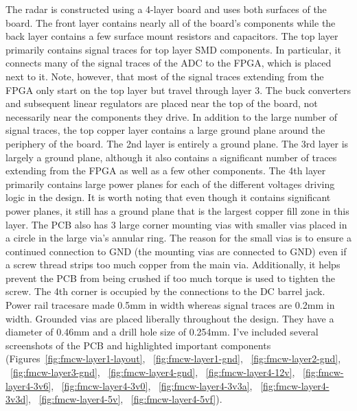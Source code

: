 \documentclass{default}
\begin{document}
The radar is constructed using a 4-layer board and uses both surfaces of the board. The front layer
contains nearly all of the board's components while the back layer contains a few surface mount
resistors and capacitors. The top layer primarily contains signal traces for top layer SMD
components. In particular, it connects many of the signal traces of the ADC to the FPGA, which is
placed next to it. Note, however, that most of the signal traces extending from the FPGA only start
on the top layer but travel through layer 3. The buck converters and subsequent linear regulators
are placed near the top of the board, not necessarily near the components they drive. In addition to
the large number of signal traces, the top copper layer contains a large ground plane around the
periphery of the board. The 2nd layer is entirely a ground plane. The 3rd layer is largely a ground
plane, although it also contains a significant number of traces extending from the FPGA as well as a
few other components. The 4th layer primarily contains large power planes for each of the different
voltages driving logic in the design. It is worth noting that even though it contains significant
power planes, it still has a ground plane that is the largest copper fill zone in this layer. The
PCB also has 3 large corner mounting vias with smaller vias placed in a circle in the large via's
annular ring. The reason for the small vias is to ensure a continued connection to GND (the mounting
vias are connected to GND) even if a screw thread strips too much copper from the main
via. Additionally, it helps prevent the PCB from being crushed if too much torque is used to tighten
the screw. The 4th corner is occupied by the connections to the DC barrel jack. Power rail tracesare
made 0.5mm in width whereas signal traces are 0.2mm in width. Grounded vias are placed liberally
throughout the design. They have a diameter of 0.46mm and a drill hole size of 0.254mm. I've included
several screenshots of the PCB and highlighted important
components (Figures~\ref{fig:fmcw-layer1-layout}, ~\ref{fig:fmcw-layer1-gnd},
~\ref{fig:fmcw-layer2-gnd}, ~\ref{fig:fmcw-layer3-gnd}, ~\ref{fig:fmcw-layer4-gnd},
~\ref{fig:fmcw-layer4-12v}, ~\ref{fig:fmcw-layer4-3v6}, ~\ref{fig:fmcw-layer4-3v0},
~\ref{fig:fmcw-layer4-3v3a}, ~\ref{fig:fmcw-layer4-3v3d}, ~\ref{fig:fmcw-layer4-5v},
~\ref{fig:fmcw-layer4-5vf}).
\end{document}
